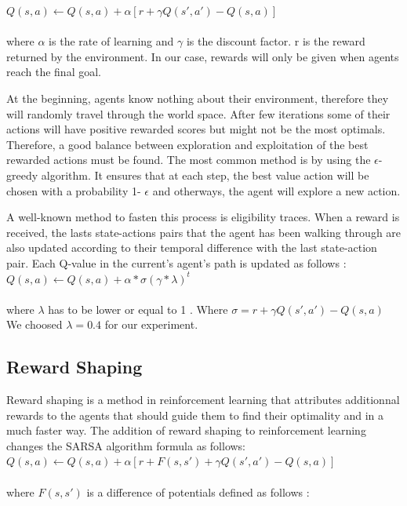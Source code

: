 \documentclass[letterpaper]{article}
\begin{document}
$Q(s, a) \leftarrow  Q(s, a) +  \alpha [r + \gamma Q(s', a') - Q(s,a)]$\\\\
where $\alpha$ is the rate of learning and $\gamma$ is the discount factor. r is the reward returned by the environment. In our case, rewards will only be given when agents reach the final goal. 

At the beginning, agents know nothing about their environment, therefore they will randomly travel through the world space. After few iterations some of their actions will have positive rewarded scores but might not be the most optimals. Therefore, a good balance between exploration and exploitation of the best rewarded actions must be found. The most common method is by using the $\epsilon$-greedy algorithm. It ensures that at each step, the best value action will be chosen with a probability 1- $\epsilon$ and otherways, the agent will explore a new action.


A well-known method to fasten this process is eligibility traces. When a reward is received, the lasts state-actions pairs that the agent has been walking through are also updated according to their temporal difference with the last state-action pair. Each Q-value in the current's agent's path is updated as follows : \\

$Q(s, a) \leftarrow  Q(s, a) +  \alpha *  \sigma (\gamma * \lambda)^t$\\\\
where $\lambda$ has to be lower or equal to 1 \citep{etrace}. Where $ \sigma = r + \gamma Q(s', a') - Q(s,a)$ We choosed  $\lambda = 0.4$ for our experiment.

\subsection{Reward Shaping}

Reward shaping is a method in reinforcement learning that attributes additionnal rewards to the agents that should guide them to find their optimality and in a much faster way.
The addition of reward shaping to reinforcement learning changes the SARSA algorithm formula as follows: \\

$Q(s, a) \leftarrow  Q(s, a) +  \alpha [r + F(s, s') + \gamma Q(s', a') - Q(s,a)]$\\\\
where $ F(s, s')$  is a difference of potentials defined as follows : \\
\end{document}
